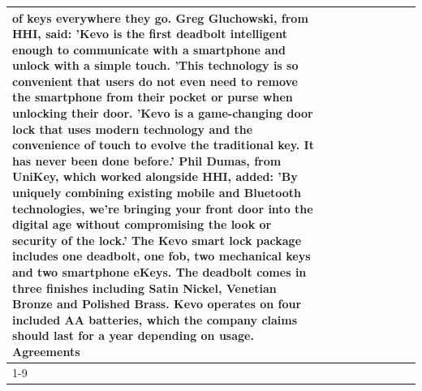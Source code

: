 \begin{table}[H]
\begin{tabular}{lllrlllll}
of keys everywhere they go. Greg Gluchowski, from HHI, said: 'Kevo is the first deadbolt intelligent enough to communicate with a smartphone and unlock with a simple touch. 'This technology is so convenient that users do not even need to remove the smartphone from their pocket or purse when unlocking their door. 'Kevo is a game-changing door lock that uses modern technology and the convenience of touch to evolve the traditional key. It has never been done before.' Phil Dumas, from UniKey, which worked alongside HHI, added: 'By uniquely combining existing mobile and Bluetooth technologies, we’re bringing your front door into the digital age without compromising the look or security of the lock.' The Kevo smart lock package includes one deadbolt, one fob, two mechanical keys and two smartphone eKeys. The deadbolt comes in three finishes including Satin Nickel, Venetian Bronze and Polished Brass. Kevo operates on four included AA batteries, which the company claims should last for a year depending on usage. Agreements \\
\cline{1-9}

\end{tabular}
\end{table}
